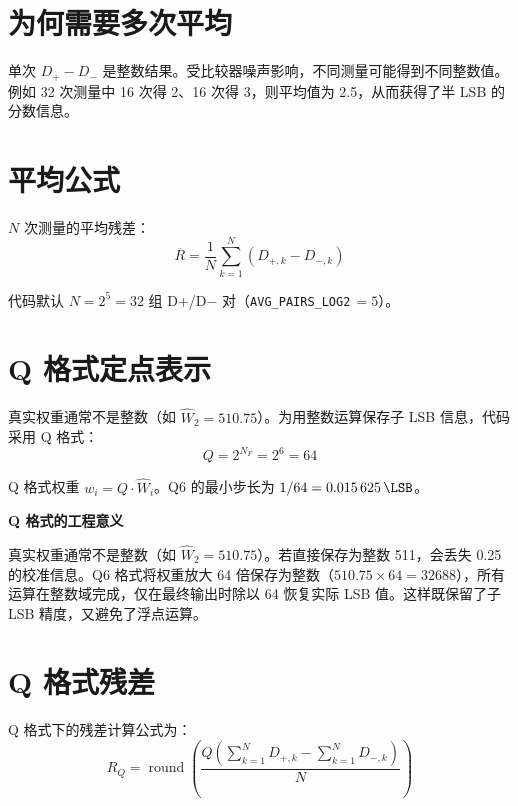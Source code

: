 \documentclass[
  UTF8,
  a4paper,
  11pt,
  oneside,
  fontset=fandol
]{ctexrep}
\newenvironment{notebox}[1]{%
  \begin{center}
  \begin{minipage}{0.94\textwidth}
  \colorbox{graybox}{%
    \parbox{0.96\textwidth}{\textbf{#1}}}
  \vspace{0.35em}\par
}{%
  \end{minipage}
  \end{center}
}
\newcommand{\round}{\operatorname{round}}
\newcommand{\code}[1]{\texttt{#1}}
\newcommand{\What}{\widehat{W}}
\newcommand{\Rbar}{\overline{R}}
\newcommand{\roundop}[1]{\round\!\left(#1\right)}
\begin{document}
\section{为何需要多次平均}

单次 $D_+ - D_-$ 是整数结果。受比较器噪声影响，不同测量可能得到不同整数值。例如 32 次测量中 16 次得 2、16 次得 3，则平均值为 2.5，从而获得了半 LSB 的分数信息。

\section{平均公式}

$N$ 次测量的平均残差：
\begin{equation}
\boxed{\Rbar = \frac{1}{N} \sum_{k=1}^{N} \left(D_{+,k} - D_{-,k}\right)}
\label{eq:Rbar}
\end{equation}

代码默认 $N = 2^5 = 32$ 组 D+/D$-$ 对（\code{AVG\_PAIRS\_LOG2}\,$=5$）。

\section{Q 格式定点表示}

真实权重通常不是整数（如 $\What_2 = 510.75$）。为用整数运算保存子 LSB 信息，代码采用 Q 格式：
\begin{equation}
Q = 2^{N_F} = 2^6 = 64
\end{equation}

Q 格式权重 $w_i = Q \cdot \What_i$。Q6 的最小步长为 $1/64 = \SI{0.015625}{\LSB}$。

\begin{notebox}{Q 格式的工程意义}
真实权重通常不是整数（如 $\What_2 = 510.75$）。若直接保存为整数 511，会丢失 \SI{0.25}{\LSB} 的校准信息。Q6 格式将权重放大 64 倍保存为整数（$510.75 \times 64 = 32688$），所有运算在整数域完成，仅在最终输出时除以 64 恢复实际 LSB 值。这样既保留了子 LSB 精度，又避免了浮点运算。
\end{notebox}

\section{Q 格式残差}

Q 格式下的残差计算公式为：
\begin{equation}
\boxed{R_Q = \roundop{\frac{Q \left(\sum_{k=1}^{N} D_{+,k} - \sum_{k=1}^{N} D_{-,k}\right)}{N}}}
\label{eq:RQ}
\end{equation}
\end{document}
